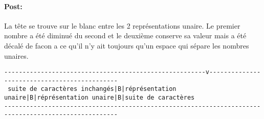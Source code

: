\documentclass[a4paper,11pt]{article}
\begin{document}
\paragraph{Post:}
La tête se trouve sur le blanc entre les 2 représentations unaire. Le premier nombre a été diminué du second et le deuxième conserve sa valeur mais a été décalé de facon a ce qu'il n'y ait toujours qu'un espace qui sépare les nombres unaires.
\begin{footnotesize}
\begin{verbatim}
-------------------------------------------------------v---------------------------------------------
 suite de caractères inchangés|B|réprésentation unaire|B|réprésentation unaire|B|suite de caractères
-----------------------------------------------------------------------------------------------------
\end{verbatim}
\end{footnotesize}
\end{document}
